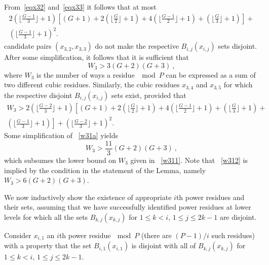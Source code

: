 From~\eqref{eqx32} and~\eqref{eqx33} it follows that at most
\begin{equation}\label{w31}\begin{array}{lll} 2 \left( \lfloor \frac{G-1}{3}\rfloor +1\right) \left[
(G+1)+2\left( \lfloor \frac{G}{2}\rfloor +1\right) +4\left(
\lfloor \frac{G-1}{2}\rfloor +1\right) + \left( \lfloor
\frac{G}{3}\rfloor +1\right)\right]+ \\\left( \lfloor
\frac{G-1}{3}\rfloor +1\right)^2.
\end{array}\end{equation}
candidate pairs $(x_{3,2},x_{3,3})$ do not make the respective
$B_{i,j}(x_{i,j})$ sets disjoint. After some simplification, it
follows that it is sufficient that
\begin{equation}\label{w311}
W_3 > 3 (G+2)(G+3)~,
\end{equation}
where $W_3$ is the number of ways a residue $\mod P$ can be
expressed as a sum of two different cubic residues. Similarly, the
cubic residues $x_{3,4}$ and $x_{3,5}$ for which the respective
disjoint $B_{i,j}(x_{i,j})$ sets  exist, provided that
\begin{equation}\label{w31a}\begin{array}{lll} W_3
> 2 \left( \lfloor \frac{G-2}{3}\rfloor +1\right)\left[
(G+1)+2\left( \lfloor \frac{G}{2}\rfloor +1\right) +4\left( \lfloor
\frac{G-1}{2}\rfloor +1\right)  +\left( \lfloor \frac{G}{3}\rfloor
+1\right)+\right.\\\left.\left( \lfloor \frac{G-1}{3}\rfloor
+1\right)\right]+ \left( \lfloor \frac{G-2}{3}\rfloor +1\right)^2.
\end{array}\end{equation}
 Some simplification of ~\eqref{w31a} yields
\begin{equation}\label{w312}
W_3 > \frac{11}{3} (G+2)(G+3)~,
\end{equation}
which subsumes the lower bound on $W_3$ given in ~\eqref{w311}.
Note that ~\eqref{w312} is implied by the condition in the
statement of the Lemma, namely $W_3 >6(G+2)(G+3)$.

We now inductively show the existence of appropriate $i$th power
residues and their sets, assuming that we have successfully
identified power residues at lower levels for which all the sets
$B_{k,j}(x_{k,j})$ for $1 \leq k <i$, $1 \leq j \leq 2k-1$ are
disjoint.

Consider $x_{i,1}$ an $i$th power residue$~\mod P$ (there are
$(P-1)/i$ such  residues) with a property that the set
$B_{i,1}(x_{i,1})$ is disjoint with all of $B_{k,j}(x_{k,j})$ for
$1 \leq k <i$, $1 \leq j \leq 2k-1$.


